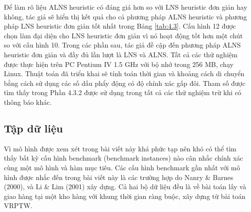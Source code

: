 Để làm rõ liệu ALNS heuristic có đáng giá hơn so với LNS heuristic đơn giản hay không, tác giả sẽ hiển thị kết quả cho cả phương pháp ALNS heuristic và phương pháp LNS heuristic đơn giản tốt nhất trong Bảng \ref{tab:4.3}. Cấu hình 12 được chọn làm đại diện cho LNS heuristic đơn giản vì nó hoạt động tốt hơn một chút so với cấu hình 10. Trong các phần sau, tác giả đề cập đến phương pháp ALNS heuristic đơn giản và đầy đủ lần lượt là LNS và ALNS.
Tất cả các thử nghiệm được thực hiện trên PC Pentium IV 1.5 GHz với bộ nhớ trong 256 MB, chạy Linux. Thuật toán đã triển khai sẽ tính toán thời gian và khoảng cách di chuyển bằng cách sử dụng các số dấu phẩy động có độ chính xác gấp đôi. Tham số được tìm thấy trong Phần 4.3.2 được sử dụng trong tất cả các thử nghiệm trừ khi có thông báo khác.

\subsection{Tập dữ liệu}
Vì mô hình được xem xét trong bài viết này khá phức tạp nên khó có thể tìm thấy bất kỳ cấu hình benchmark (benchmark instances) nào cân nhắc chính xác cùng một mô hình và hàm mục tiêu. Các cấu hình benchmark gần nhất với mô hình được nhắc đến trong bài viết này là các trường hợp do Nanry \& Barnes (2000), và Li \& Lim (2001) xây dựng. Cả hai bộ dữ liệu đều là về bài toán lấy và giao hàng tại một kho hàng với khung thời gian ràng buộc, xây dựng từ bài toán VRPTW.


